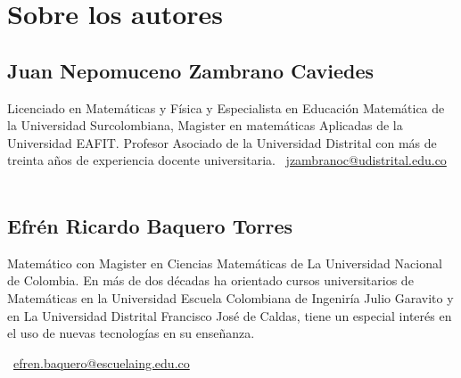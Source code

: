 \chapter*{Sobre los autores}

\section{Juan Nepomuceno Zambrano Caviedes}

Licenciado en Matemáticas y Física y Especialista en Educación Matemática de la Universidad Surcolombiana,  Magister en matemáticas Aplicadas de la Universidad EAFIT. Profesor Asociado de la Universidad Distrital con más de treinta años de experiencia docente universitaria.
\faEnvelope~\url{jzambranoc@udistrital.edu.co}\\
\\

\section{Efrén Ricardo Baquero Torres}
\noindent 
Matemático con Magister en Ciencias Matemáticas de La Universidad Nacional de Colombia. En más de dos décadas ha orientado cursos universitarios de Matemáticas en la Universidad Escuela Colombiana de Ingeniría Julio Garavito y en La Universidad Distrital Francisco José de Caldas, tiene un especial 
interés en el uso de nuevas tecnologías en su enseñanza.

\faEnvelope~\url{efren.baquero@escuelaing.edu.co}\\
